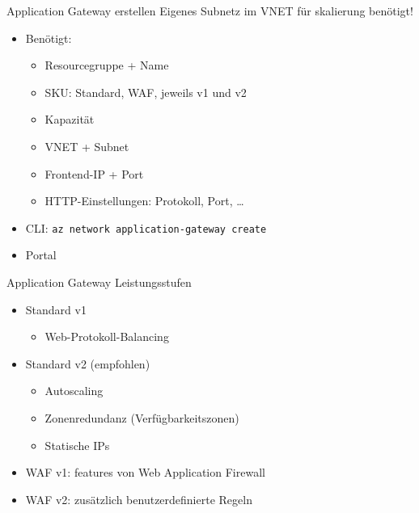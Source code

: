 \begin{flashcard}[Definition]{Application Gateway erstellen}
    Eigenes Subnetz im VNET für skalierung benötigt!
    \begin{itemize}
        \item Benötigt:
            \begin{itemize}
                \item Resourcegruppe + Name
                \item SKU: Standard, WAF, jeweils v1 und v2
                \item Kapazität
                \item VNET + Subnet
                \item Frontend-IP + Port
                \item HTTP-Einstellungen: Protokoll, Port, \ldots
            \end{itemize}
        \item CLI: \texttt{az network application-gateway create}
        \item Portal
    \end{itemize}
\end{flashcard}

\begin{flashcard}[Definition]{Application Gateway Leistungsstufen}
    \begin{itemize}
        \item Standard v1
            \begin{itemize}
             \item Web-Protokoll-Balancing
            \end{itemize}
        \item Standard v2 (empfohlen)
            \begin{itemize}
                \item Autoscaling
                \item Zonenredundanz (Verfügbarkeitszonen)
                \item Statische IPs
            \end{itemize}
        \item WAF v1: features von Web Application Firewall
        \item WAF v2: zusätzlich benutzerdefinierte Regeln
    \end{itemize}
\end{flashcard}


